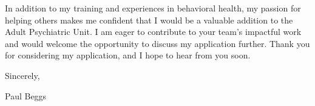 \documentclass[11pt,letterpaper]{article}
\begin{document}

In addition to my training and experiences in behavioral health, my passion for helping others makes me confident that I would be a valuable addition to the Adult Psychiatric Unit. I am eager to contribute to your team's impactful work and would welcome the opportunity to discuss my application further. Thank you for considering my application, and I hope to hear from you soon.


Sincerely, \\

\vspace*{1cm}

Paul Beggs
\end{document}
